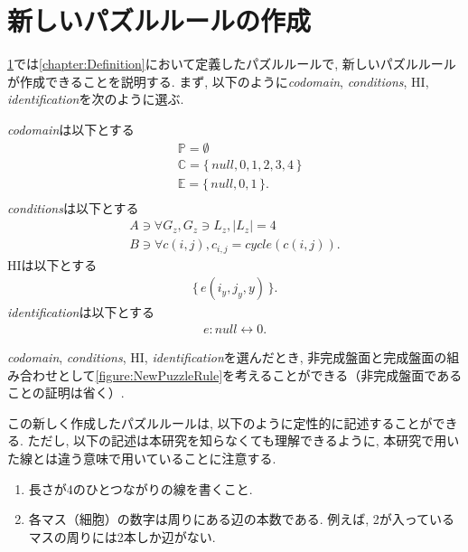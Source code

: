 \section{新しいパズルルールの作成}\label{section:NewPuzzleRule}
\cref{section:NewPuzzleRule}では\cref{chapter:Definition}において定義したパズルルールで, 新しいパズルルールが作成できることを説明する. まず, 以下のように\textit{codomain}, \textit{conditions}, HI, \textit{identification}を次のように選ぶ.

\textit{codomain}は以下とする
\begin{align}
   & \mathbb{P}=\emptyset                       \\
   & \mathbb{C}=\{\,\textit{null},0,1,2,3,4\,\} \\
   & \mathbb{E}=\{\,\textit{null},0,1\,\}  .    \\
\end{align}
\textit{conditions}は以下とする
\begin{align}
  A\ni \forall G_z, G_z\ni L_z, |L_z|=4 \\
  B\ni \forall c(i,j), c_{i,j}= cycle(c(i,j)).
\end{align}
HIは以下とする
\begin{align}
  \{\,e(i_y,j_y,y)\,\}.
\end{align}
\textit{identification}は以下とする
\begin{align}
  e:\textit{null}\leftrightarrow 0.
\end{align}

\textit{codomain}, \textit{conditions}, HI, \textit{identification}を選んだとき, 非完成盤面と完成盤面の組み合わせとして\cref{figure:NewPuzzleRule}を考えることができる（非完成盤面であることの証明は省く）.

この新しく作成したパズルルールは, 以下のように定性的に記述することができる. ただし, 以下の記述は本研究を知らなくても理解できるように, 本研究で用いた線とは違う意味で用いていることに注意する.

\begin{enumerate}
  \item 長さが4のひとつながりの線を書くこと.
  \item 各マス（細胞）の数字は周りにある辺の本数である. 例えば, 2が入っているマスの周りには2本しか辺がない.
\end{enumerate}

